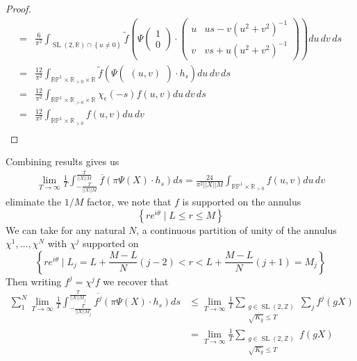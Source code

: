 \documentclass{article}
\newcommand{\set}[1]{\left\{#1\right\}}
\newcommand{\norm}[1]{\lvert\lvert#1\rvert\rvert}
\newcommand{\slr}{\operatorname{SL}(2,\mathbb{R})}
\newcommand{\slz}{\operatorname{SL}(2,\mathbb{Z})}
\begin{document}
\begin{proof}
\begin{align*}
                = &\frac{6}{\pi^2}\int_{\slr \cap \set{u \neq 0}} \tilde{f}\left(\Psi \begin{pmatrix} 1 \\ 0 \end{pmatrix} \cdot \begin{pmatrix} u & us - v(u^2 + v^2)^{-1} \\ v & vs + u(u^2 + v^2)^{-1} \end{pmatrix}\right)du\,dv\,ds \\
                = &\frac{12}{\pi^2}\int_{\mathbb{RP}^1 \times \mathbb{R}_{>0}\times \mathbb{R}} \tilde{f}\left(\Psi \begin{pmatrix} (u,v)\end{pmatrix}\cdot h_s\right)du\,dv\,ds \\
                = &\frac{12}{\pi^2}\int_{\mathbb{RP}^1 \times \mathbb{R}_{>0}\times \mathbb{R}} \chi_\epsilon(-s)f(u,v)du\,dv\,ds \\
                = &\frac{12}{\pi^2}\int_{\mathbb{RP}^1 \times \mathbb{R}_{>0}} f(u,v)du\,dv \\
            \end{align*}
        \end{proof}
        Combining results gives us
        \begin{align*}
            \lim_{T \to \infty} \frac{1}{T} \int_{-\frac{T}{\norm{X}M}}^{\frac{T}{\norm{X}M}}\overline{f}(\pi \Psi(X)\cdot h_s)ds = \frac{24}{\pi^2\norm{X}M}\int_{\mathbb{RP}^1 \times \mathbb{R}_{>0}}f(u,v)du\,dv
        \end{align*}
        eliminate the \(1/M\) factor, we note that \(f\) is supported on the annulus \[\set{re^{i\theta} \mid L \leq r \leq M}\] We can take for any natural \(N\), a continuous partition of unity of the annulus \(\chi^1,\hdots,\chi^N\) with \(\chi^j\) supported on \[\set{re^{i\theta} \mid L_j = L + \frac{M-L}{N}(j-2) < r < L + \frac{M-L}{N}(j+1) = M_j}\]
        Then writing \(f^j = \chi^j f\) we recover that
        \begin{align*}
            \sum_1^N\lim_{T \to \infty} \frac{1}{T} \int_{-\frac{T}{\norm{X}M_j}}^{\frac{T}{\norm{X}M_j}}\overline{f^j}(\pi \Psi(X)\cdot h_s)ds &\leq \lim_{T \to \infty} \frac{1}{T}\sum_{\substack{g \in \slz \\ \sqrt{K_g} \leq T}}\sum_j f^j(g X) \\
            &= \lim_{T \to \infty} \frac{1}{T}\sum_{\substack{g \in \slz \\ \sqrt{K_g} \leq T}} f(g X)
        \end{align*}
\end{document}
